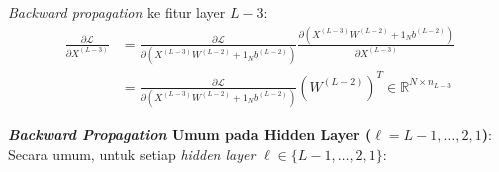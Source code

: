 \documentclass[11pt,a4paper]{article}
\def\mathbf#1{#1}%
\theoremstyle{plain}
\theoremstyle{definition}
\theoremstyle{remark}
\begin{document}
\textit{Backward propagation} ke fitur layer $L-3$:
\begin{align}
    \frac{\partial \mathcal{L}}{\partial X^{(L-3)}} &= \frac{\partial \mathcal{L}}{\partial \left( X^{(L-3)} W^{(L-2)} + \mathbf{1}_N \mathbf{b}^{(L-2)} \right)} \frac{\partial \left( X^{(L-3)} W^{(L-2)} + \mathbf{1}_N \mathbf{b}^{(L-2)} \right)}{\partial X^{(L-3)}} \nonumber \\
    &= \frac{\partial \mathcal{L}}{\partial \left( X^{(L-3)} W^{(L-2)} + \mathbf{1}_N \mathbf{b}^{(L-2)} \right)} \left( W^{(L-2)} \right)^T \in \mathbb{R}^{N \times n_{L-3}}
\end{align}

\noindent \textbf{\textit{Backward Propagation} Umum pada Hidden Layer ($\ell = L-1, \dots, 2, 1$)}: \\
Secara umum, untuk setiap \textit{hidden layer} $\ell \in \{L-1, \dots, 2, 1\}$:
\end{document}
